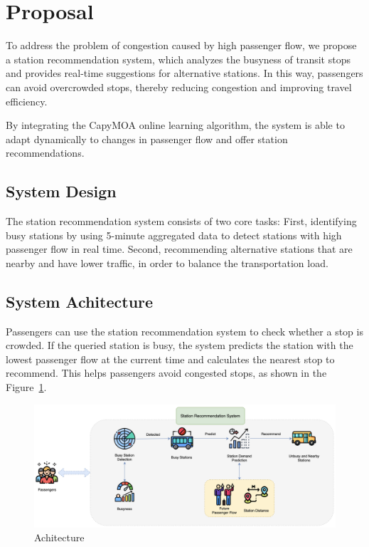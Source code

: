 \documentclass[11pt]{article} %
\begin{document}
\section{Proposal}
To address the problem of congestion caused by high passenger flow,
we propose a station recommendation system,
which analyzes the busyness of transit stops and provides real-time suggestions for alternative stations. In this way, passengers can avoid overcrowded stops,
thereby reducing congestion and improving travel efficiency. 

By integrating the CapyMOA online learning algorithm,
the system is able to adapt dynamically to changes in passenger flow and offer station recommendations.

\subsection{System Design}
The station recommendation system consists of two core tasks: First, identifying busy stations by using 5-minute aggregated data to detect stations with high passenger flow in real time. Second, recommending alternative stations that are nearby and have lower traffic, in order to balance the transportation load.

\subsection{System Achitecture}
Passengers can use the station recommendation system to check whether a stop is crowded. If the queried station is busy, the system predicts the station with the lowest passenger flow at the current time and calculates the nearest stop to recommend. This helps passengers avoid congested stops, as shown in the Figure~\ref{fig:achitecture}.

\begin{figure}[H]
	\centering
	\caption{Achitecture}
	\label{fig:achitecture}
	\includegraphics[scale=0.4]{architecture}
\end{figure}
\end{document}
